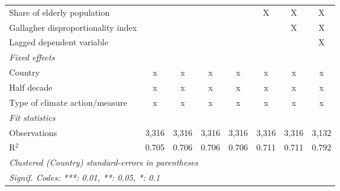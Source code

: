 \begin{tabular}{lccccccc}
   Share of elderly population                                              &               &                &               &               & X             & X             & X\\  
   Gallagher disproportionality index                                       &               &                &               &               &               & X             & X\\  
   Lagged dependent variable                                                &               &                &               &               &               &               & X\\  
   \emph{Fixed effects}\\
   Country                                                                  & x             & x              & x             & x             & x             & x             & x\\  
   Half decade                                                              & x             & x              & x             & x             & x             & x             & x\\  
   Type of climate action/measure                                           & x             & x              & x             & x             & x             & x             & x\\  
   \midrule \emph{Fit statistics}\\
   Observations                                                             & 3,316         & 3,316          & 3,316         & 3,316         & 3,316         & 3,316         & 3,132\\  
   R$^2$                                                                    & 0.705         & 0.706          & 0.706         & 0.706         & 0.711         & 0.711         & 0.792\\  
   \midrule
   \multicolumn{8}{l}{\emph{Clustered (Country) standard-errors in parentheses}}\\
   \multicolumn{8}{l}{\emph{Signif. Codes: ***: 0.01, **: 0.05, *: 0.1}}\\
\end{tabular}
\par\endgroup



